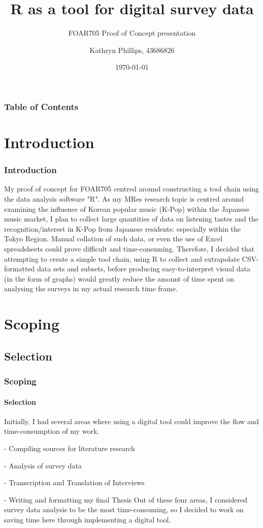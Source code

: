 \documentclass{beamer}
\title{R as a tool for digital survey data}
\subtitle{FOAR705 Proof of Concept presentation}
\author{Kathryn Phillips, 43686826}
\institute{Macquarie University}
\date{\today}
\begin{document}
\begin{frame}
\frame{\titlepage}
\end{frame}

\begin{frame}
\frametitle{Table of Contents}
\tableofcontents
\end{frame}

\section{Introduction}
\begin{frame}
\frametitle{Introduction}
My proof of concept for FOAR705 centred around constructing a tool chain using the data analysis software "R". As my MRes research topic is centred around examining the influence of Korean popular music (K-Pop) within the Japanese music market, I plan to collect large quantities of data on listening tastes and the recognition/interest in K-Pop from Japanese residents: especially within the Tokyo Region. 
\newline
\newline
 Manual collation of such data, or even the use of Excel spreadsheets could prove difficult and time-consuming. Therefore, I decided that attempting to create a simple tool chain, using R to collect and extrapolate CSV-formatted data sets and subsets, before producing easy-to-interpret visual data (in the form of graphs) would greatly reduce the amount of time spent on analysing the surveys in my actual research time frame.
 \end{frame}

\section{Scoping}
\subsection{Selection}
\begin{frame}
\frametitle{Scoping}
\framesubtitle{Selection}
Initially, I had several areas where using a digital tool could improve the flow and time-consumption of my work.
\newline
\item - Compiling sources for literature research
\item - Analysis of survey data
\item - Transcription and Translation of Interviews
\item - Writing and formatting my final Thesis
\newline
\newline
Out of these four areas, I considered survey data analysis to be the most time-consuming, so I decided to work on saving time here through implementing a digital tool.
\end{frame}
\end{document}
